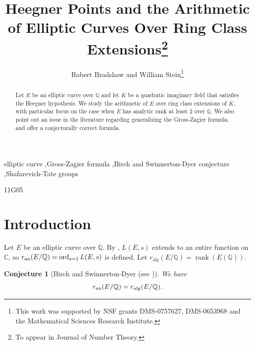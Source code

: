 \documentclass[preprint,12pt]{elsarticle}
\newcommand{\Q}{\mathbb{Q}}
\newcommand{\C}{\mathbb{C}}
\newcommand{\an}{{\rm an}}
\DeclareMathOperator{\alg}{alg}
\DeclareMathOperator{\ord}{ord}
\DeclareMathOperator{\rank}{rank}
\theoremstyle{plain}
\newtheorem{conjecture}[theorem]{Conjecture}
\theoremstyle{definition}
\begin{document}
\begin{frontmatter}
\title{\Large Heegner Points and the Arithmetic of Elliptic
  Curves Over Ring Class Extensions\footnote{To appear in Journal of Number Theory.}}

\author[rb,ws]{Robert Bradshaw and William Stein\footnote{This work was supported by NSF grants DMS-0757627, DMS-0653968  and the Mathematical Sciences Research Institute.}}

\address[rb]{Google, Seattle}
\address[ws]{University of Washington}

\begin{abstract} 
  Let $E$ be an elliptic curve over $\Q$ and let $K$ be a quadratic
  imaginary field that satisfies the Heegner hypothesis.  We study the
  arithmetic of $E$ over ring class extensions of $K$, with particular
  focus on the case when $E$ has analytic rank at least $2$ over
  $\Q$.  We also point out an issue in the literature regarding
  generalizing the Gross-Zagier formula, and offer a conjecturally
  correct formula.
\end{abstract}

\begin{keyword}
elliptic curve \sep Gross-Zagier formula \sep Birch and Swinnerton-Dyer conjecture \sep Shafarevich-Tate groups


\MSC 11G05

\end{keyword}

\end{frontmatter}

\section{Introduction}\label{sec:intro}


Let $E$ be an elliptic curve over $\Q$.  By \cite{wiles:fermat,
  breuil-conrad-diamond-taylor}, $L(E,s)$ extends to
an entire function on $\C$, so $r_{\an}(E/\Q) = \ord_{s=1} L(E,s)$ is
defined. Let $r_{\alg}(E/\Q) = \rank(E(\Q))$.

\begin{conjecture}[Birch and Swinnerton-Dyer (see \cite{wiles:cmi})]\label{conj:bsdrank}
We have $$r_{\an}(E/\Q) = r_{\alg}(E/\Q).$$
\end{conjecture}
\end{document}
